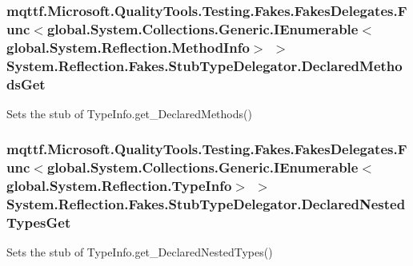 \hypertarget{class_system_1_1_reflection_1_1_fakes_1_1_stub_type_delegator_a11f305a5b0b6dcd7ddea17e710884887}{
\subsubsection[{Declared\-Methods\-Get}]{\setlength{\rightskip}{0pt plus 5cm}mqttf.\-Microsoft.\-Quality\-Tools.\-Testing.\-Fakes.\-Fakes\-Delegates.\-Func$<$global.\-System.\-Collections.\-Generic.\-I\-Enumerable$<$global.\-System.\-Reflection.\-Method\-Info$>$ $>$ System.\-Reflection.\-Fakes.\-Stub\-Type\-Delegator.\-Declared\-Methods\-Get}}\label{class_system_1_1_reflection_1_1_fakes_1_1_stub_type_delegator_a11f305a5b0b6dcd7ddea17e710884887}


Sets the stub of Type\-Info.\-get\-\_\-\-Declared\-Methods()

\hypertarget{class_system_1_1_reflection_1_1_fakes_1_1_stub_type_delegator_af5f36285a75a002fa880ab12ccba16da}{
\subsubsection[{Declared\-Nested\-Types\-Get}]{\setlength{\rightskip}{0pt plus 5cm}mqttf.\-Microsoft.\-Quality\-Tools.\-Testing.\-Fakes.\-Fakes\-Delegates.\-Func$<$global.\-System.\-Collections.\-Generic.\-I\-Enumerable$<$global.\-System.\-Reflection.\-Type\-Info$>$ $>$ System.\-Reflection.\-Fakes.\-Stub\-Type\-Delegator.\-Declared\-Nested\-Types\-Get}}\label{class_system_1_1_reflection_1_1_fakes_1_1_stub_type_delegator_af5f36285a75a002fa880ab12ccba16da}


Sets the stub of Type\-Info.\-get\-\_\-\-Declared\-Nested\-Types()

